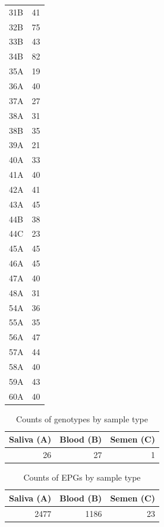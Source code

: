 \begin{longtable}{lr}
      31B &    41 \\
      32B &    75 \\
      33B &    43 \\
      34B &    82 \\
      35A &    19 \\
      36A &    40 \\
      37A &    27 \\
      38A &    31 \\
      38B &    35 \\
      39A &    21 \\
      40A &    33 \\
      41A &    40 \\
      42A &    41 \\
      43A &    45 \\
      44B &    38 \\
      44C &    23 \\
      45A &    45 \\
      46A &    45 \\
      47A &    40 \\
      48A &    31 \\
      54A &    36 \\
      55A &    35 \\
      56A &    47 \\
      57A &    44 \\
      58A &    40 \\
      59A &    43 \\
      60A &    40 \\
\end{longtable}

\begin{table}[!htbp]
\centering
\begin{tabular}{rrr}
\toprule
 Saliva (A) &  Blood (B) &  Semen (C) \\
\midrule
         26 &         27 &          1 \\
\bottomrule
\end{tabular}
\caption{Counts of genotypes by sample type}
\label{table:Counts of genotypes by sample type}
\end{table}

\begin{table}[!htbp]
\centering
\begin{tabular}{rrr}
\toprule
 Saliva (A) &  Blood (B) &  Semen (C) \\
\midrule
       2477 &       1186 &         23 \\
\bottomrule
\end{tabular}
\caption{Counts of EPGs by sample type}
\label{table:Counts of EPGs by sample type}
\end{table}

